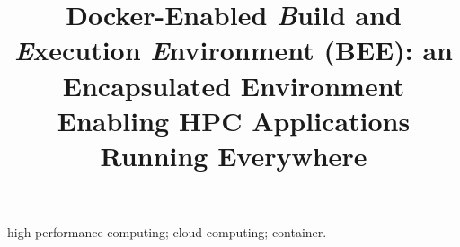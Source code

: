 \documentclass[conference]{IEEEtran}
\begin{document}
\title{Docker-Enabled \textit{B}uild and \textit{E}xecution \textit{E}nvironment (BEE):
an Encapsulated Environment Enabling
HPC Applications Running Everywhere}

\maketitle
\thispagestyle{plain}
\pagestyle{plain}


\begin{abstract}

\end{abstract}





\begin{IEEEkeywords}
high performance computing; cloud computing; container.
\end{IEEEkeywords}












%
 
\end{document}
